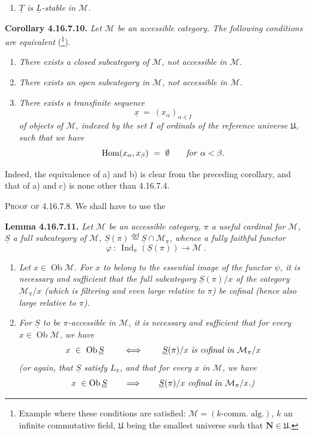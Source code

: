 \documentclass[11pt]{article}
\newcommand{\printedpage}[1]{\marginpar{\footnotesize p.~#1}}
\newcommand{\msp}[1]{\marginpar{\footnotesize [#1]}}
\newcommand{\cM}{\mathcal{M}}
\newcommand{\Ob}{\operatorname{Ob}}
\newcommand{\Hom}{\operatorname{Hom}}
\newcommand{\Ind}{\operatorname{Ind}}
\newcommand{\defeq}{\overset{\text{def}}{=}}
\begin{document}
\printedpage{189}

\begin{enumerate}
\item[\textit{b$'$)}] \textit{$\underline{T}$ is $\underline{L}$-stable in $\cM$.}
\end{enumerate}

\noindent\textbf{Corollary 4.16.7.10.} \textit{Let $\cM$ be an accessible category. The following conditions are equivalent} (\footnote[202]{Example where these conditions are satisfied: $\cM = (k\text{-comm. alg.})$, $k$ an infinite commutative field, $\mathfrak{U}$ being the smallest universe such that $\mathbf{N}\in\mathfrak{U}$.}).
\begin{enumerate}
\item[\textit{a)}] \textit{There exists a closed subcategory of $\cM$, not accessible in $\cM$.}
\item[\textit{b)}] \textit{There exists an open subcategory in $\cM$, not accessible in $\cM$.}
\item[\textit{c)}] \textit{There exists a transfinite sequence}
\[
\underline{x} \ = \ (x_\alpha)_{\alpha\in I}
\]
\textit{of objects of $\cM$, indexed by the set $I$ of ordinals of the reference universe $\mathfrak{U}$, such that we have}
\[
\Hom(x_\alpha,x_\beta) \ = \ \emptyset \qquad \text{\textit{for} } \alpha<\beta .
\]
\end{enumerate}

\noindent Indeed, the equivalence of a) and b) is clear from the preceding corollary, and that of a) and c) is none other than 4.16.7.4.

\noindent\textsc{Proof of} 4.16.7.8. We shall have to use the

\noindent\textbf{Lemma 4.16.7.11.} \textit{Let $\cM$ be an accessible category, $\pi$ a useful cardinal for $\cM$, $\underline{S}$ a full subcategory of $\cM$, $\underline{S}(\pi)\defeq\underline{S}\cap\cM_\pi$, whence a fully faithful functor}
\[
\varphi \ : \ \Ind_\pi(\underline{S}(\pi)) \longrightarrow \cM \ .
\]

\msp{page 489}
\begin{enumerate}
\item[\textit{a)}] \textit{Let $x\in\Ob\cM$. For $x$ to belong to the essential image of the functor $\psi$, it is necessary and sufficient that the full subcategory $\underline{S}(\pi)/x$ of the category $\cM_\pi/x$ (which is filtering and even large relative to $\pi$) be cofinal (hence also large relative to $\pi$).} %
\item[\textit{b)}] \textit{For $\underline{S}$ to be $\pi$-accessible in $\cM$, it is necessary and sufficient that for every $x\in\Ob\cM$, we have}
\[
x \ \in \ \Ob\underline{S} \qquad\iff\qquad \underline{S}(\pi)/x \text{ \textit{is cofinal in} } \cM_\pi/x
\]
\textit{(or again, that $\underline{S}$ satisfy $L_\pi$, and that for every $x$ in $\cM$, we have}
\[
x \ \in\Ob\underline{S} \qquad\Longrightarrow\qquad \underline{S}(\pi)/x \text{ \textit{cofinal in} } \cM_\pi/x\text{\textit{.)}}
\]
\end{enumerate}
\end{document}
